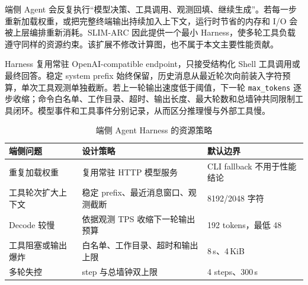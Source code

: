 端侧 Agent 会反复执行“模型决策、工具调用、观测回填、继续生成”。若每一步重新加载权重，或把完整终端输出持续加入上下文，运行时节省的内存和 I/O 会被上层编排重新消耗。SLIM-ARC 因此提供一个最小 Harness，使多轮工具负载遵守同样的资源约束。该扩展不修改计算图，也不属于本文主要性能贡献。

Harness 复用常驻 OpenAI-compatible endpoint，只接受结构化 Shell 工具调用或最终回答。稳定 system prefix 始终保留，历史消息从最近轮次向前装入字符预算，单次工具观测单独截断。若上一轮输出速度低于阈值，下一轮 \texttt{max\_tokens} 逐步收缩；命令白名单、工作目录、超时、输出长度、最大轮数和总墙钟共同限制工具闭环。模型事件和工具事件分别记录，从而区分推理慢与外部工具慢。

\begin{table}[H]
  \centering
  \small
  \caption{端侧 Agent Harness 的资源策略}
  \label{tab:agent-harness-policy}
  \begin{tabular}{p{}p{}p{}}
    \toprule
    端侧问题 & 设计策略 & 默认边界 \\
    \midrule
    重复加载权重 & 复用常驻 HTTP 模型服务 & CLI fallback 不用于性能结论 \\
    工具轮次扩大上下文 & 稳定 prefix、最近消息窗口、观测截断 & 8192/2048 字符 \\
    Decode 较慢 & 依据观测 TPS 收缩下一轮输出预算 & 192 tokens，最低 48 \\
    工具阻塞或输出爆炸 & 白名单、工作目录、超时和输出上限 & 8\,s、4\,KiB \\
    多轮失控 & step 与总墙钟双上限 & 4 steps、300\,s \\
    \bottomrule
  \end{tabular}
\end{table}
